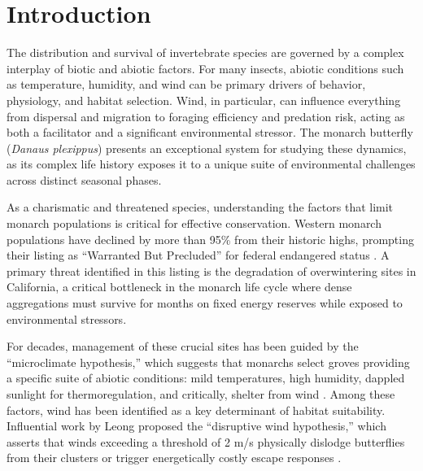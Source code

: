\usepackage{hyperref}
\usepackage{longtable}

\chapter{Introduction}
\label{ch:introduction}

The distribution and survival of invertebrate species are governed by a complex interplay of biotic and abiotic factors. For many insects, abiotic conditions such as temperature, humidity, and wind can be primary drivers of behavior, physiology, and habitat selection. Wind, in particular, can influence everything from dispersal and migration to foraging efficiency and predation risk, acting as both a facilitator and a significant environmental stressor. The monarch butterfly (\textit{Danaus plexippus}) presents an exceptional system for studying these dynamics, as its complex life history exposes it to a unique suite of environmental challenges across distinct seasonal phases.

As a charismatic and threatened species, understanding the factors that limit monarch populations is critical for effective conservation. Western monarch populations have declined by more than 95\% from their historic highs, prompting their listing as ``Warranted But Precluded'' for federal endangered status \citep{EX49BGFN}. A primary threat identified in this listing is the degradation of overwintering sites in California, a critical bottleneck in the monarch life cycle where dense aggregations must survive for months on fixed energy reserves while exposed to environmental stressors.

For decades, management of these crucial sites has been guided by the ``microclimate hypothesis,'' which suggests that monarchs select groves providing a specific suite of abiotic conditions: mild temperatures, high humidity, dappled sunlight for thermoregulation, and critically, shelter from wind \citep{leongMicroenvironmentalFactorsAssociated1990a}. Among these factors, wind has been identified as a key determinant of habitat suitability. Influential work by Leong proposed the ``disruptive wind hypothesis,'' which asserts that winds exceeding a threshold of 2 m/s physically dislodge butterflies from their clusters or trigger energetically costly escape responses \citep{leongEvaluationManagementCalifornia2016}.

